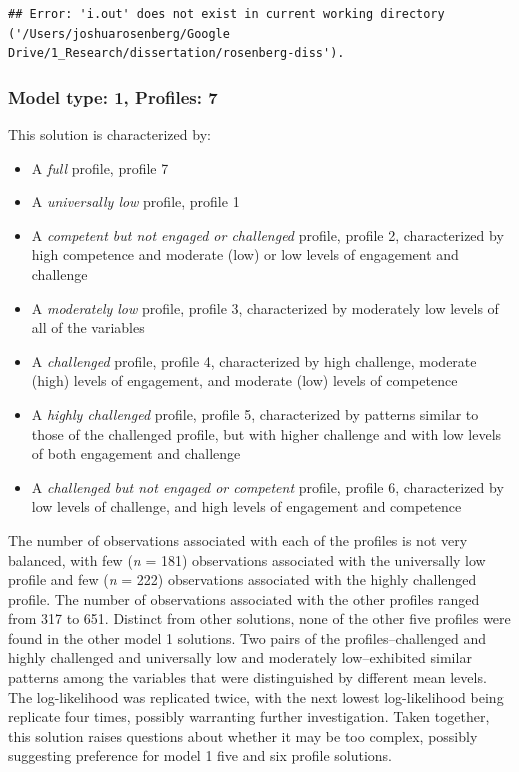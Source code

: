\documentclass[]{book}
\providecommand{\tightlist}{%
  \setlength{\itemsep}{0pt}\setlength{\parskip}{0pt}}
\theoremstyle{definition}
\theoremstyle{definition}
\theoremstyle{definition}
\theoremstyle{remark}
\begin{document}
\begin{verbatim}
## Error: 'i.out' does not exist in current working directory ('/Users/joshuarosenberg/Google Drive/1_Research/dissertation/rosenberg-diss').
\end{verbatim}

\subsubsection{Model type: 1, Profiles:
7}\label{model-type-1-profiles-7}

This solution is characterized by:

\begin{itemize}
\tightlist
\item
  A \emph{full} profile, profile 7
\item
  A \emph{universally low} profile, profile 1
\item
  A \emph{competent but not engaged or challenged} profile, profile 2,
  characterized by high competence and moderate (low) or low levels of
  engagement and challenge
\item
  A \emph{moderately low} profile, profile 3, characterized by
  moderately low levels of all of the variables
\item
  A \emph{challenged} profile, profile 4, characterized by high
  challenge, moderate (high) levels of engagement, and moderate (low)
  levels of competence
\item
  A \emph{highly challenged} profile, profile 5, characterized by
  patterns similar to those of the challenged profile, but with higher
  challenge and with low levels of both engagement and challenge
\item
  A \emph{challenged but not engaged or competent} profile, profile 6,
  characterized by low levels of challenge, and high levels of
  engagement and competence
\end{itemize}

The number of observations associated with each of the profiles is not
very balanced, with few (\emph{n} = 181) observations associated with
the universally low profile and few (\emph{n} = 222) observations
associated with the highly challenged profile. The number of
observations associated with the other profiles ranged from 317 to 651.
Distinct from other solutions, none of the other five profiles were
found in the other model 1 solutions. Two pairs of the
profiles--challenged and highly challenged and universally low and
moderately low--exhibited similar patterns among the variables that were
distinguished by different mean levels. The log-likelihood was
replicated twice, with the next lowest log-likelihood being replicate
four times, possibly warranting further investigation. Taken together,
this solution raises questions about whether it may be too complex,
possibly suggesting preference for model 1 five and six profile
solutions.
\end{document}
